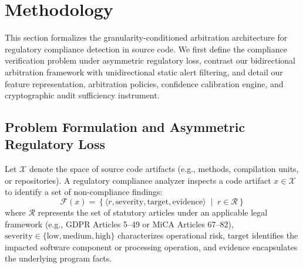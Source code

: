 \section{Methodology}
\label{sec:methodology}

This section formalizes the granularity-conditioned arbitration architecture for regulatory compliance detection in source code. We first define the compliance verification problem under asymmetric regulatory loss, contrast our bidirectional arbitration framework with unidirectional static alert filtering, and detail our feature representation, arbitration policies, confidence calibration engine, and cryptographic audit sufficiency instrument.

\subsection{Problem Formulation and Asymmetric Regulatory Loss}
\label{sec:methodology:formulation}

Let $\mathcal{X}$ denote the space of source code artifacts (e.g., methods, compilation units, or repositories). A regulatory compliance analyzer inspects a code artifact $x \in \mathcal{X}$ to identify a set of non-compliance findings:
\begin{equation}
\mathcal{F}(x) = \left\{ \langle r, \text{severity}, \text{target}, \text{evidence} \rangle \;\middle|\; r \in \mathcal{R} \right\}
\end{equation}
where $\mathcal{R}$ represents the set of statutory articles under an applicable legal framework (e.g., GDPR Articles 5--49 or MiCA Articles 67--82), $\text{severity} \in \{\text{low}, \text{medium}, \text{high}\}$ characterizes operational risk, $\text{target}$ identifies the impacted software component or processing operation, and $\text{evidence}$ encapsulates the underlying program facts.

